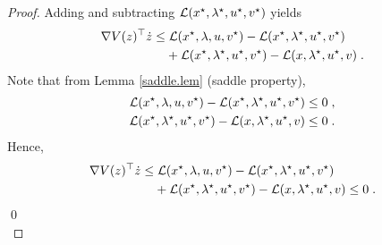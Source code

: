 \documentclass[journal,twoside,web]{ieeecolor}
\begin{document}
\begin{proof}
Adding and subtracting ${\cal L}(x^\star,\lambda^\star,u^\star,v^\star)$ yields
\begin{align} \label{deriv_v}
\nabla V(z)^\top \dot z\leq&\; {\cal L}(x^\star,\lambda,u,v^\star)-{\cal L}(x^\star,\lambda^\star,u^\star,v^\star)\\
&+{\cal L}(x^\star,\lambda^\star,u^\star,v^\star)-{\cal L}(x,\lambda^\star,u^\star,v) \;.\nonumber
\end{align}
Note that from Lemma \ref{saddle.lem} (saddle property),
\begin{align*}{\cal L}(x^\star,\lambda,u,v^\star)-{\cal L}(x^\star,\lambda^\star,u^\star,v^\star)\leq 0\;,
\\
{\cal L}(x^\star,\lambda^\star,u^\star,v^\star)-{\cal L}(x,\lambda^\star,u^\star,v)\leq 0\;.
\end{align*}
Hence, 
\begin{align} \label{deriv_v2}
\nabla V(z)^\top \dot z\leq&\; {\cal L}(x^\star,\lambda,u,v^\star)-{\cal L}(x^\star,\lambda^\star,u^\star,v^\star)\\
&+{\cal L}(x^\star,\lambda^\star,u^\star,v^\star)-{\cal L}(x,\lambda^\star,u^\star,v)\leq 0 \;.\nonumber
\end{align}
\qed\\
\end{proof}
\end{document}
